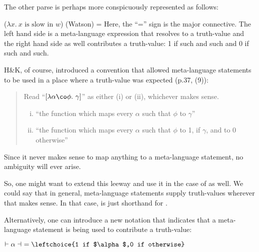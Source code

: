 %
The other parse is perhaps more conspicuously represented as follows:

\ex ($\lambda x.\ x \mbox{ is slow in } w$) (Watson) =  \xe
%
Here, the ``='' sign is the major connective. The left hand side is a
meta-language expression that resolves to a truth-value and the right hand side
as well contributes a truth-value: 1 if such and such and 0 if such and such.

H\&K, of course, introduced a convention that allowed meta-language
statements to be used in a place where a truth-value was expected (p.37, (9)):

\begin{quote}
  Read ``$[\lambda \alpha\co \phi.\ \gamma]$'' as either (i) or (ii),
  whichever makes sense.
  \begin{enumerate}[(i)]
  \item ``the function which maps every $\alpha$ such that $\phi$ to
    $\gamma$''
  \item ``the function which maps every $\alpha$ such that $\phi$ to
    1, if $\gamma$, and to 0 otherwise''
  \end{enumerate}
\end{quote}
%
Since it never makes sense to map anything to a meta-language statement, no
ambiguity will ever arise.

%
So, one might want to extend this leeway and use it in the case of
 as well. We could say that in general, meta-language
statements supply truth-values wherever that makes sense. In that case,
 is just shorthand for .

\newcommand{\nupsis}[1]{\ensuremath{\vdash #1 \dashv}}

Alternatively, %
%
one can introduce a new notation that indicates that a meta-language statement
is being used to contribute a truth-value:

\ex $\nupsis{\alpha}\ = \leftchoice{1 if $\alpha$,0 if otherwise}$ \xe

